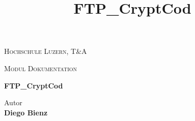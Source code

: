 
\begin{center}
\vspace{1.5cm}
{\scshape\LARGE Hochschule Luzern, T\&A \par}
{\scshape\Large Modul Dokumentation\par}
\vspace{2.0cm}
\title{FTP\_CryptCod}
{\huge\bfseries FTP\_CryptCod\par}

\vspace{16.0cm}

\end{center}

Autor \\
\textbf{Diego Bienz} \\


